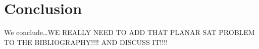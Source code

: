 \section{Conclusion}We conclude\ldots WE REALLY NEED TO ADD THAT PLANAR SAT PROBLEM TO THE BIBLIOGRAPHY!!!! AND DISCUSS IT!!!!